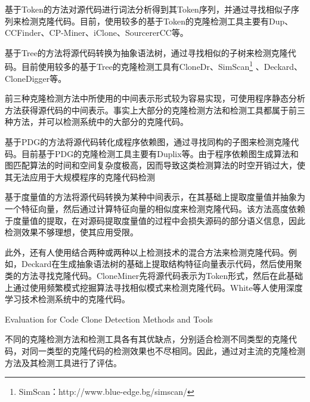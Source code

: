 基于Token的方法对源代码进行词法分析得到其Token序列，并通过寻找相似子序列来检测克隆代码。目前，使用较多的基于Token的克隆检测工具主要有Dup\cite{baker1995finding}、CCFinder\cite{kamiya2002ccfinder}、CP-Miner\cite{li2006cp}、iClone\cite{gode2009incremental}、SourcererCC\cite{sajnani2016sourcerercc}等。

基于Tree的方法将源代码转换为抽象语法树，通过寻找相似的子树来检测克隆代码。目前使用较多的基于Tree的克隆检测工具有CloneDr\cite{baxter1998clone}、SimScan\footnote{SimScan：http://www.blue-edge.bg/simscan/}%
、Deckard\cite{jiang2007deckard}、CloneDigger\cite{bulychev2008duplicate}等。

前三种克隆检测方法中所使用的中间表示形式较为容易实现，可使用程序静态分析方法获得源代码的中间表示。事实上大部分的克隆检测方法和检测工具都属于前三种方法，并可以检测系统中的大部分的克隆代码。

基于PDG的方法将源代码转化成程序依赖图，通过寻找同构的子图来检测克隆代码。目前基于PDG的克隆检测工具主要有Duplix\cite{krinke2001identifying}等。由于程序依赖图生成算法和图匹配算法的时间和空间复杂度极高，因而导致这类检测算法的时空开销过大，使其无法应用于大规模程序的克隆代码检测

基于度量值的方法将源代码转换为某种中间表示，在其基础上提取度量值并抽象为一个特征向量，然后通过计算特征向量的相似度来检测克隆代码。该方法高度依赖于度量值的提取，在对源码提取度量值的过程中会损失源码的部分语义信息，因此检测效果不够理想，使其应用受限。

此外，还有人使用结合两种或两种以上检测技术的混合方法来检测克隆代码。例如，Deckard在生成抽象语法树的基础上提取结构特征向量表示代码，然后使用聚类的方法寻找克隆代码\cite{jiang2007deckard}。CloneMiner先将源代码表示为Token形式，然后在此基础上通过使用频繁模式挖掘算法寻找相似模式来检测克隆代码\cite{basit2009data}。White等人使用深度学习技术检测系统中的克隆代码\cite{white2016deep}。


{Evaluation for Code Clone Detection Methods and Tools}

不同的克隆检测方法和检测工具各有其优缺点，分别适合检测不同类型的克隆代码，对同一类型的克隆代码的检测效果也不尽相同。因此，通过对主流的克隆检测方法及其检测工具进行了评估\cite{bellon2007comparison,rattan2013software,roy2009comparison,svajlenko2014evaluating}。


